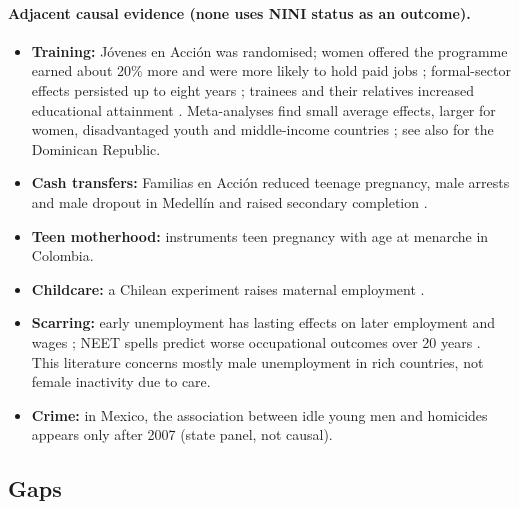 \documentclass[11pt]{article}
\begin{document}
\paragraph{Adjacent causal evidence (none uses NINI status as an outcome).}
\begin{itemize}
\item \textbf{Training:} J\'ovenes en Acci\'on was randomised; women offered the programme earned about 20\% more and were more likely to hold paid jobs \citep{attanasio2011}; formal-sector effects persisted up to eight years \citep{attanasio2017}; trainees and their relatives increased educational attainment \citep{kugler2022}. Meta-analyses find small average effects, larger for women, disadvantaged youth and middle-income countries \citep{kluve2019,card2018}; see also \citet{ibarraran2019} for the Dominican Republic.
\item \textbf{Cash transfers:} Familias en Acci\'on reduced teenage pregnancy, male arrests and male dropout in Medell\'in \citep{attanasio2021} and raised secondary completion \citep{baez2011}.
\item \textbf{Teen motherhood:} \citet{aguero} instruments teen pregnancy with age at menarche in Colombia.
\item \textbf{Childcare:} a Chilean experiment raises maternal employment \citep{martinez2017}.
\item \textbf{Scarring:} early unemployment has lasting effects on later employment and wages \citep{gregg2001,mroz2006}; NEET spells predict worse occupational outcomes over 20 years \citep{ralston2016}. This literature concerns mostly male unemployment in rich countries, not female inactivity due to care.
\item \textbf{Crime:} in Mexico, the association between idle young men and homicides appears only after 2007 \citep{dehoyos2016crime} (state panel, not causal).
\end{itemize}

\subsection{Gaps}
\end{document}
